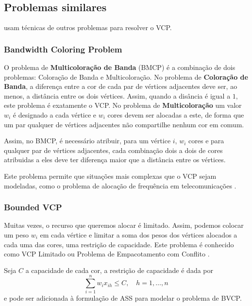\documentclass[11pt]{article}
\begin{document}
\subsection{Problemas similares}
\label{sec:org78acee1}
\textcites{Cornaz2008oneonecorrespondence}[][]{Cornaz2017SolvingVertexColoring} usam técnicas de outros problemas para resolver o VCP.
\subsubsection{Bandwidth Coloring Problem}
\label{sec:orga43b850}
O problema de \textbf{Multicoloração de Banda} (BMCP) é a combinação de dois problemas: Coloração de Banda e Multicoloração.
No problema de \textbf{Coloração de Banda}, a diferença entre a cor de cada par de vértices adjacentes deve ser, ao menos, a distância entre os dois vértices. Assim, quando a disância é igual a \(1\), este problema é exatamente o VCP.
No problema de \textbf{Multicoloração} um valor \(w_i\) é designado a cada vértice e \(w_i\) cores devem ser alocadas a este, de forma que um par qualquer de vértices adjacentes não compartilhe nenhum cor em comum.

Assim, no BMCP, é necessário atribuir, para um vértice \(i\), \(w_i\) cores e para qualquer par de vértices adjacentes, cada combinação dois a dois de cores atribuidas a eles deve ter diferença maior que a distância entre os vértices.

Este problema permite que situações mais complexas que o VCP sejam modeladas, como o problema de alocação de frequência em telecomunicações \autocite{Aardal2007Modelssolutiontechniques}.

\subsubsection{Bounded VCP}
\label{sec:org23b8f72}
Muitas vezes, o recurso que queremos alocar é limitado. Assim, podemos colocar um peso \(w_i\) em cada vértice e limitar a soma dos pesos dos vértices alocados a cada uma das cores, uma restrição de capacidade.
Este problema é conhecido como VCP Limitado ou Problema de Empacotamento com Conflito \textcite{Connolly1991KnapsackProblemsAlgorithms}.

Seja \(C\) a capacidade de cada cor, a restrição de capacidade é dada por
\[ \sum_{i=1}^n w_i x_{ih} \leq C, \quad h = 1, \dots, n\]
e pode ser adicionada à formulação de ASS para modelar o problema de BVCP.
\end{document}
